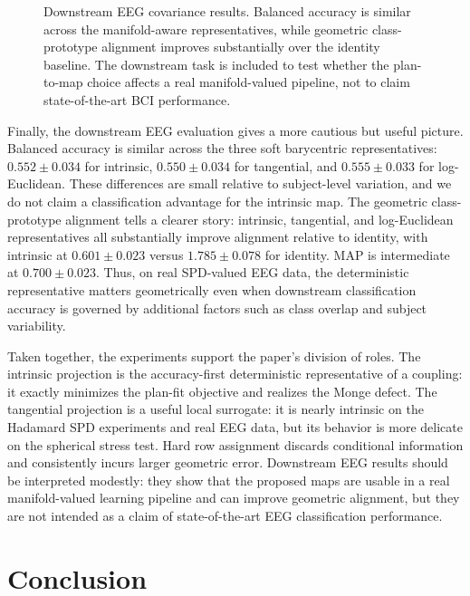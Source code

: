 \documentclass[10pt]{article} %
\theoremstyle{definition}
\providecommand{\1}{\mathbf{1}}
\begin{document}
\begin{figure}[t]
\centering
\resizebox{0.98\linewidth}{!}{%
	
}
\caption{Downstream EEG covariance results. Balanced accuracy is similar across the manifold-aware representatives, while geometric class-prototype alignment improves substantially over the identity baseline. The downstream task is included to test whether the plan-to-map choice affects a real manifold-valued pipeline, not to claim state-of-the-art BCI performance.}
\label{fig:eeg-downstream}
\end{figure}

Finally, the downstream EEG evaluation gives a more cautious but useful picture. Balanced accuracy is similar across the three soft barycentric representatives: $0.552\pm0.034$ for intrinsic, $0.550\pm0.034$ for tangential, and $0.555\pm0.033$ for log-Euclidean. These differences are small relative to subject-level variation, and we do not claim a classification advantage for the intrinsic map. The geometric class-prototype alignment tells a clearer story: intrinsic, tangential, and log-Euclidean representatives all substantially improve alignment relative to identity, with intrinsic at $0.601\pm0.023$ versus $1.785\pm0.078$ for identity. MAP is intermediate at $0.700\pm0.023$. Thus, on real SPD-valued EEG data, the deterministic representative matters geometrically even when downstream classification accuracy is governed by additional factors such as class overlap and subject variability.

Taken together, the experiments support the paper's division of roles. The intrinsic projection is the accuracy-first deterministic representative of a coupling: it exactly minimizes the plan-fit objective and realizes the Monge defect. The tangential projection is a useful local surrogate: it is nearly intrinsic on the Hadamard SPD experiments and real EEG data, but its behavior is more delicate on the spherical stress test. Hard row assignment discards conditional information and consistently incurs larger geometric error. Downstream EEG results should be interpreted modestly: they show that the proposed maps are usable in a real manifold-valued learning pipeline and can improve geometric alignment, but they are not intended as a claim of state-of-the-art EEG classification performance.


\section{Conclusion}
\label{sec:conclusion}
\end{document}
